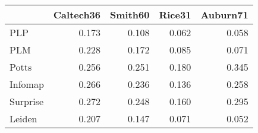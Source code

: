 \begin{tabular}{lrrrr}
\toprule
{} & Caltech36 & Smith60 & Rice31 & Auburn71 \\
\midrule
PLP      &     0.173 &   0.108 &  0.062 &    0.058 \\
PLM      &     0.228 &   0.172 &  0.085 &    0.071 \\
Potts    &     0.256 &   0.251 &  0.180 &    0.345 \\
Infomap  &     0.266 &   0.236 &  0.136 &    0.258 \\
Surprise &     0.272 &   0.248 &  0.160 &    0.295 \\
Leiden   &     0.207 &   0.147 &  0.071 &    0.052 \\
\bottomrule
\end{tabular}
